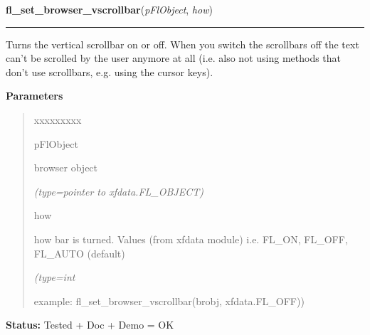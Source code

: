     \vspace{0.5ex}

\hspace{.8\funcindent}\begin{boxedminipage}{\funcwidth}

    \raggedright \textbf{fl\_set\_browser\_vscrollbar}(\textit{pFlObject}, \textit{how})

    \vspace{-1.5ex}

    \rule{\textwidth}{0.5\fboxrule}
\setlength{\parskip}{2ex}
    Turns the vertical scrollbar on or off. When you switch the scrollbars 
    off the text can't be scrolled by the user anymore at all (i.e. also 
    not using methods that don't use scrollbars, e.g. using the cursor 
    keys).

\setlength{\parskip}{1ex}
      \textbf{Parameters}
      \vspace{-1ex}

      \begin{quote}
        \begin{Ventry}{xxxxxxxxx}

          \item[pFlObject]

          browser object

            {\it (type=pointer to xfdata.FL\_OBJECT)}

          \item[how]

          how bar is turned. Values (from xfdata module) i.e. FL\_ON, 
          FL\_OFF, FL\_AUTO (default)

            {\it (type=int

example: fl\_set\_browser\_vscrollbar(brobj, xfdata.FL\_OFF))}

        \end{Ventry}

      \end{quote}

\textbf{Status:} Tested + Doc + Demo = OK



    \end{boxedminipage}

    \label{xformslib:flbrowser:fl_set_browser_hscrollbar}

    \vspace{0.5ex}

